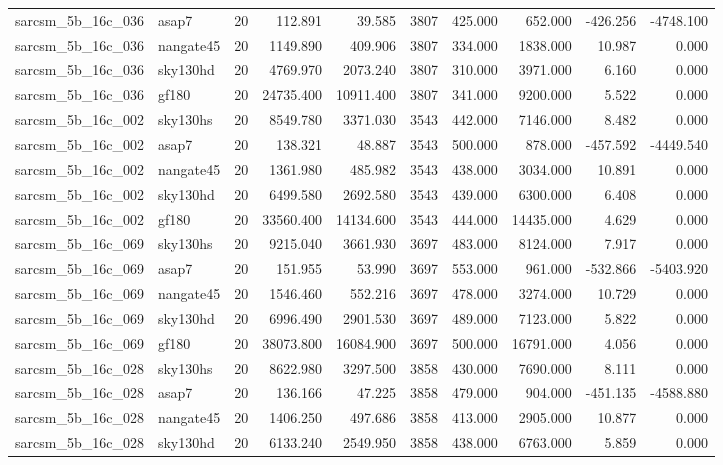 \documentclass{article}
\begin{document}
\begin{longtable}{llrrrrrrrr}
sarcsm\_5b\_16c\_036 & asap7 & 20 & 112.891 & 39.585 & 3807 & 425.000 & 652.000 & -426.256 & -4748.100 \\
sarcsm\_5b\_16c\_036 & nangate45 & 20 & 1149.890 & 409.906 & 3807 & 334.000 & 1838.000 & 10.987 & 0.000 \\
sarcsm\_5b\_16c\_036 & sky130hd & 20 & 4769.970 & 2073.240 & 3807 & 310.000 & 3971.000 & 6.160 & 0.000 \\
sarcsm\_5b\_16c\_036 & gf180 & 20 & 24735.400 & 10911.400 & 3807 & 341.000 & 9200.000 & 5.522 & 0.000 \\
sarcsm\_5b\_16c\_002 & sky130hs & 20 & 8549.780 & 3371.030 & 3543 & 442.000 & 7146.000 & 8.482 & 0.000 \\
sarcsm\_5b\_16c\_002 & asap7 & 20 & 138.321 & 48.887 & 3543 & 500.000 & 878.000 & -457.592 & -4449.540 \\
sarcsm\_5b\_16c\_002 & nangate45 & 20 & 1361.980 & 485.982 & 3543 & 438.000 & 3034.000 & 10.891 & 0.000 \\
sarcsm\_5b\_16c\_002 & sky130hd & 20 & 6499.580 & 2692.580 & 3543 & 439.000 & 6300.000 & 6.408 & 0.000 \\
sarcsm\_5b\_16c\_002 & gf180 & 20 & 33560.400 & 14134.600 & 3543 & 444.000 & 14435.000 & 4.629 & 0.000 \\
sarcsm\_5b\_16c\_069 & sky130hs & 20 & 9215.040 & 3661.930 & 3697 & 483.000 & 8124.000 & 7.917 & 0.000 \\
sarcsm\_5b\_16c\_069 & asap7 & 20 & 151.955 & 53.990 & 3697 & 553.000 & 961.000 & -532.866 & -5403.920 \\
sarcsm\_5b\_16c\_069 & nangate45 & 20 & 1546.460 & 552.216 & 3697 & 478.000 & 3274.000 & 10.729 & 0.000 \\
sarcsm\_5b\_16c\_069 & sky130hd & 20 & 6996.490 & 2901.530 & 3697 & 489.000 & 7123.000 & 5.822 & 0.000 \\
sarcsm\_5b\_16c\_069 & gf180 & 20 & 38073.800 & 16084.900 & 3697 & 500.000 & 16791.000 & 4.056 & 0.000 \\
sarcsm\_5b\_16c\_028 & sky130hs & 20 & 8622.980 & 3297.500 & 3858 & 430.000 & 7690.000 & 8.111 & 0.000 \\
sarcsm\_5b\_16c\_028 & asap7 & 20 & 136.166 & 47.225 & 3858 & 479.000 & 904.000 & -451.135 & -4588.880 \\
sarcsm\_5b\_16c\_028 & nangate45 & 20 & 1406.250 & 497.686 & 3858 & 413.000 & 2905.000 & 10.877 & 0.000 \\
sarcsm\_5b\_16c\_028 & sky130hd & 20 & 6133.240 & 2549.950 & 3858 & 438.000 & 6763.000 & 5.859 & 0.000 \\

\end{longtable}
\end{document}
